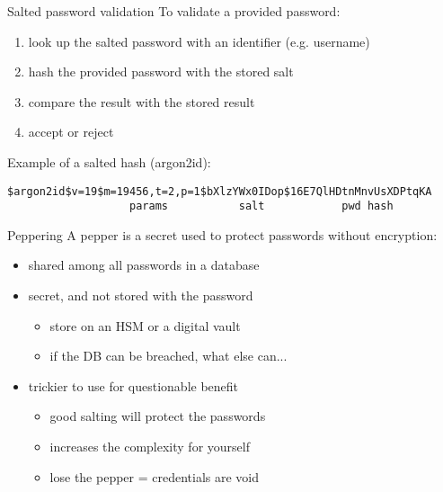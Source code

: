 \begin{frame}[fragile]{Salted password validation}
  To validate a provided password:
  \begin{enumerate}[<+(1)->]
    \item look up the salted password with an identifier (e.g. username)
    \item hash the provided password with the stored salt
    \item compare the result with the stored result
    \item accept or reject
  \end{enumerate}

  \vspace*{1em}

  \pause
  Example of a salted hash (argon2id):
  \vspace*{-1em}
  \begin{center}
    \texttt{\$argon2id\$v=19\${\color{Melon}m=19456,t=2,p=1}\${\color{CadetBlue}bXlzYWx0IDop}\${\color{PineGreen}16E7QlHDtnMnvUsXDPtqKA}}\\
    \texttt{%
    \ \ \ \ \ \ \ \ \ \ \ \ \ \ \ \ %
    \ {\color{Melon}params}\ \ \ \ \ %
    \ \ \ \ \ {\color{CadetBlue}salt}\ \ \ \ \ %
    \ \ \ \ \ \ {\color{PineGreen}pwd hash}%
    \ \ \ \ \ \ \ }
  \end{center}
\end{frame}

\begin{frame}{Peppering}
  A pepper is a secret used to protect passwords without encryption:
  \begin{itemize}[<+(1)->]
    \item shared among all passwords in a database
    \item secret, and not stored with the password
    \begin{itemize}
      \item store on an HSM or a digital vault
      \item if the DB can be breached, what else can...
    \end{itemize}
    \item trickier to use for questionable benefit
    \begin{itemize}
      \item good salting will protect the passwords
      \item increases the complexity for yourself
      \item lose the pepper = credentials are void
    \end{itemize}
  \end{itemize}
\end{frame}

